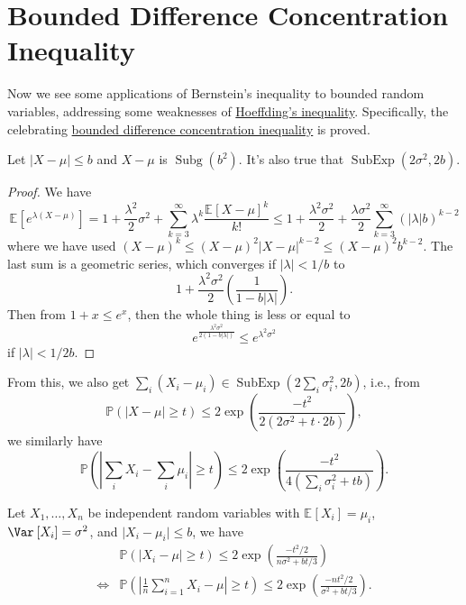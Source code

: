 \section{Bounded Difference Concentration Inequality}
Now we see some applications of Bernstein's inequality to bounded random variables, addressing some weaknesses of \hyperref[thm:Hoeffding-inequality]{Hoeffding's inequality}. Specifically, the celebrating \hyperref[thm:bounded-difference-concentration-inequality]{bounded difference concentration inequality} is proved.

\begin{lemma}
	Let \(\vert X - \mu \vert \leq b\) and \(X - \mu \) is \(\mathop{\mathrm{Subg}}(b^2) \). It's also true that \(\mathop{\mathrm{SubExp}}(2 \sigma ^{2} , 2b) \).
\end{lemma}
\begin{proof}
	We have
	\[
		\mathbb{E}_{}\left[e^{\lambda (X - \mu )} \right]
		= 1 + \frac{\lambda ^{2} }{2} \sigma ^{2} + \sum_{k=3}^{\infty} \lambda ^k \frac{\mathbb{E}_{}\left[X - \mu  \right] ^k}{k!}
		\leq 1 + \frac{\lambda ^2 \sigma ^2}{2} + \frac{\lambda \sigma ^2}{2} \sum_{k=3}^{\infty} (\vert \lambda  \vert b)^{k - 2}
	\]
	where we have used \((X - \mu )^k \leq (X - \mu )^2 \vert X - \mu \vert ^{k - 2} \leq (X - \mu )^2 b^{k-2}\). The last sum is a geometric series, which converges if \(\vert \lambda  \vert < 1 / b\) to
	\[
		1 + \frac{\lambda ^2 \sigma ^2}{2} \left( \frac{1}{1 - b \vert \lambda \vert } \right) .
	\]
	Then from \(1 + x \leq e^x\), then the whole thing is less or equal to
	\[
		e^{\frac{\lambda ^2 \sigma ^{2} }{2(1 - b \vert \lambda \vert )}} \leq e^{\lambda ^{2} \sigma ^{2} }
	\]
	if \(\vert \lambda  \vert < 1 / 2b\).
\end{proof}

From this, we also get \(\sum_{i} (X_i - \mu _i) \in \mathop{\mathrm{SubExp}}(2 \sum_{i} \sigma _i^{2} , 2b) \), i.e., from
\[
	\mathbb{P} (\vert X - \mu  \vert \geq t) \leq 2 \exp \left( \frac{- t^2}{2(2\sigma ^{2} + t\cdot 2b)} \right),
\]
we similarly have
\[
	\mathbb{P} \left( \left\vert \sum_{i} X_i - \sum_{i} \mu _i \right\vert \geq t \right) \leq 2 \exp \left( \frac{-t^2}{4\left( \sum_{i} \sigma _i^2 + tb\right) } \right).
\]

\begin{corollary}
	Let \(X_1, \dots , X_n\) be independent random variables with \(\mathbb{E}_{}\left[X_i \right] = \mu _i\), \(\Var_{}\left[X_i \right] = \sigma ^{2}\), and \(\vert X_i - \mu _i \vert \leq b\), we have
	\[
		\begin{split}
			&\mathbb{P} \left( \left\vert X_i - \mu  \right\vert \geq t \right) \leq 2 \exp \left( \frac{- t^2 / 2}{n \sigma ^{2} + bt / 3 } \right) \\
			\iff & \mathbb{P} \left( \left\vert \frac{1}{n}\sum_{i=1}^{n} X_i - \mu \right\vert \geq t \right) \leq 2 \exp \left( \frac{- nt^2 / 2}{\sigma ^{2} + bt / 3} \right).
		\end{split}
	\]
\end{corollary}

